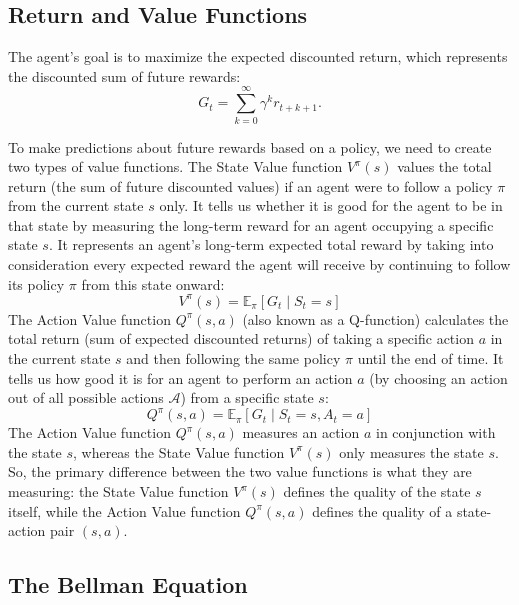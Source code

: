 \subsection{Return and Value Functions}

The agent's goal is to maximize the expected discounted return, which represents the discounted sum of future rewards:
\begin{equation}
    G_t = \sum_{k=0}^{\infty} \gamma^k r_{t+k+1}.
    \label{eq:return}
\end{equation}

To make predictions about future rewards based on a policy, we need to create two types of value functions. The State Value function $V^{\pi}(s)$ values the total return (the sum of future discounted values) if an agent were to follow a policy $\pi$ from the current state $s$ only. It tells us whether it is good for the agent to be in that state by measuring the long-term reward for an agent occupying a specific state $s$. It represents an agent's long-term expected total reward by taking into consideration every expected reward the agent will receive by continuing to follow its policy $\pi$ from this state onward:
\begin{equation}
    V^{\pi}(s) = \mathbb{E}_{\pi} \left[ G_t \mid S_t = s \right]
\end{equation}
The Action Value function $Q^{\pi}(s, a)$ (also known as a Q-function) calculates the total return (sum of expected discounted returns) of taking a specific action $a$ in the current state $s$ and then following the same policy $\pi$ until the end of time. It tells us how good it is for an agent to perform an action $a$ (by choosing an action out of all possible actions $\mathcal{A}$) from a specific state $s$:
\begin{equation}
    Q^{\pi}(s, a) = \mathbb{E}_{\pi} \left[ G_t \mid S_t = s, A_t = a \right]
\end{equation}
The Action Value function $Q^{\pi}(s, a)$ measures an action $a$ in conjunction with the state $s$, whereas the State Value function $V^{\pi}(s)$ only measures the state $s$. So, the primary difference between the two value functions is what they are measuring: the State Value function $V^{\pi}(s)$ defines the quality of the state $s$ itself, while the Action Value function $Q^{\pi}(s, a)$ defines the quality of a state-action pair $(s, a)$.

\subsection{The Bellman Equation}

